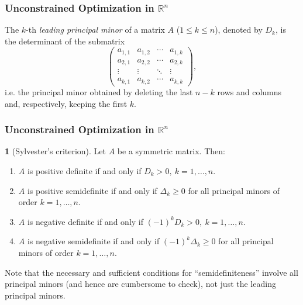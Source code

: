 \documentclass[10pt]{beamer}
\theoremstyle{definition}
\newtheorem{Fact}{\translate{Fact}}
\begin{document}
\begin{frame}[fragile]
\frametitle{Unconstrained Optimization in $ \mathbb{R}^n $}
The $ k $-th \emph{leading principal minor} of a matrix $ A $ ($ 1\leq k \leq n $), denoted by $ D_k $, is the determinant of the submatrix \[  \begin{pmatrix}
a_{1,1} & a_{1,2} & \cdots & a_{1,k}\\
a_{2,1} & a_{2,2} & \cdots & a_{2,k}\\
\vdots&\vdots& \ddots& \vdots\\
a_{k,1} & a_{k,2} & \cdots & a_{k,k}
\end{pmatrix} , \]
i.e. the principal minor obtained by deleting the last $ n-k $ rows and columns and, respectively, keeping the first $ k $.

\end{frame}

\begin{frame}[fragile]
\frametitle{Unconstrained Optimization in $ \mathbb{R}^n $}
\begin{Fact}[Sylvester's criterion]
Let $ A $ be a symmetric matrix. Then:
\begin{enumerate}
\item $ A $ is positive definite if and only if $ D_k >0,~k=1,\ldots,n $.
\item $ A $ is positive semidefinite if and only if $ \Delta_k \geq 0 $ for all principal minors of order $ k = 1,\ldots,n $.
\item $ A $ is negative definite if and only if $ (-1)^k D_k >0,~k=1,\ldots,n $.
\item $ A $ is negative semidefinite if and only if $ (-1)^k \Delta_k \geq 0 $ for all principal minors of order $ k = 1,\ldots,n $.
\end{enumerate}
\label{fc:Sylvester}
\end{Fact}

Note that the necessary and sufficient conditions for ``semidefiniteness'' involve all principal minors (and hence are cumbersome to check), not just the leading principal minors.
\end{frame}
\end{document}
